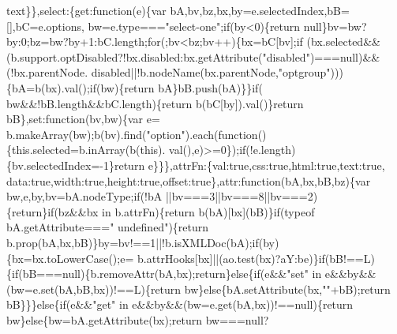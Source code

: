 \begin{DoxyCode}
      text\}\},select:\{\textcolor{keyword}{get}:\textcolor{keyword}{function}(e)\{var bA,bv,bz,bx,by=e.selectedIndex,bB=[],bC=e.options,
      bw=e.type===\textcolor{stringliteral}{"select-one"};\textcolor{keywordflow}{if}(by<0)\{\textcolor{keywordflow}{return} null\}bv=bw?by:0;bz=bw?by+1:bC.length;\textcolor{keywordflow}{for}(;bv<bz;bv++)\{bx=bC[bv];\textcolor{keywordflow}{if}
      (bx.selected&&(b.support.optDisabled?!bx.disabled:bx.getAttribute(\textcolor{stringliteral}{"disabled"})===null)&&(!bx.parentNode.
      disabled||!b.nodeName(bx.parentNode,\textcolor{stringliteral}{"optgroup"})))\{bA=b(bx).val();\textcolor{keywordflow}{if}(bw)\{\textcolor{keywordflow}{return} bA\}bB.push(bA)\}\}\textcolor{keywordflow}{if}(
      bw&&!bB.length&&bC.length)\{\textcolor{keywordflow}{return} b(bC[by]).val()\}\textcolor{keywordflow}{return} bB\},\textcolor{keyword}{set}:\textcolor{keyword}{function}(bv,bw)\{var e=
      b.makeArray(bw);b(bv).find(\textcolor{stringliteral}{"option"}).each(\textcolor{keyword}{function}()\{this.selected=b.inArray(b(\textcolor{keyword}{this}).
      val(),e)>=0\});\textcolor{keywordflow}{if}(!e.length)\{bv.selectedIndex=-1\}\textcolor{keywordflow}{return} e\}\}\},attrFn:\{val:\textcolor{keyword}{true},css:\textcolor{keyword}{true},html:\textcolor{keyword}{true},text:\textcolor{keyword}{true},
      data:\textcolor{keyword}{true},width:\textcolor{keyword}{true},height:\textcolor{keyword}{true},offset:\textcolor{keyword}{true}\},attr:\textcolor{keyword}{function}(bA,bx,bB,bz)\{var bw,e,by,bv=bA.nodeType;\textcolor{keywordflow}{if}(!bA
      ||bv===3||bv===8||bv===2)\{\textcolor{keywordflow}{return}\}\textcolor{keywordflow}{if}(bz&&bx in b.attrFn)\{\textcolor{keywordflow}{return} b(bA)[bx](bB)\}\textcolor{keywordflow}{if}(typeof bA.getAttribute===\textcolor{stringliteral}{"
      undefined"})\{\textcolor{keywordflow}{return} b.prop(bA,bx,bB)\}by=bv!==1||!b.isXMLDoc(bA);\textcolor{keywordflow}{if}(by)\{bx=bx.toLowerCase();e=
      b.attrHooks[bx]||(ao.test(bx)?aY:be)\}\textcolor{keywordflow}{if}(bB!==L)\{\textcolor{keywordflow}{if}(bB===null)\{b.removeAttr(bA,bx);\textcolor{keywordflow}{return}\}\textcolor{keywordflow}{else}\{\textcolor{keywordflow}{if}(e&&\textcolor{stringliteral}{"set"} 
      in e&&by&&(bw=e.set(bA,bB,bx))!==L)\{\textcolor{keywordflow}{return} bw\}\textcolor{keywordflow}{else}\{bA.setAttribute(bx,\textcolor{stringliteral}{""}+bB);\textcolor{keywordflow}{return} bB\}\}\}\textcolor{keywordflow}{else}\{\textcolor{keywordflow}{if}(e&&\textcolor{stringliteral}{"get"} in 
      e&&by&&(bw=e.get(bA,bx))!==null)\{\textcolor{keywordflow}{return} bw\}\textcolor{keywordflow}{else}\{bw=bA.getAttribute(bx);\textcolor{keywordflow}{return} bw===null?

\end{DoxyCode}
